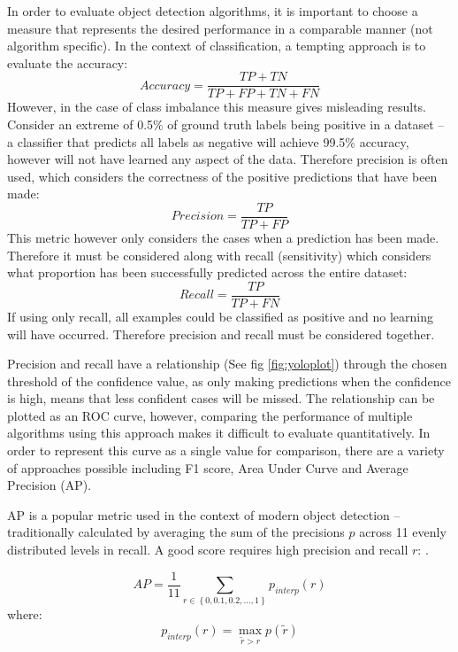 \documentclass[a4paper,twoside,12pt]{report}
\begin{document}
In order to evaluate object detection algorithms, it is important to choose a measure that represents the desired performance in a comparable manner (not algorithm specific). In the context of classification, a tempting approach is to evaluate the accuracy:
\begin{equation}
Accuracy = \frac{TP + TN}{TP + FP + TN + FN}
\end{equation}
However, in the case of class imbalance this measure gives misleading results. Consider an extreme of 0.5\% of ground truth labels being positive in a dataset -- a classifier that predicts all labels as negative will achieve 99.5\% accuracy, however will not have learned any aspect of the data. Therefore precision is often used, which considers the correctness of the positive predictions that have been made:
\begin{equation}
Precision = \frac{TP}{TP + FP}
\end{equation}
This metric however only considers the cases when a prediction has been made. Therefore it must be considered along with recall (sensitivity) which considers what proportion has been successfully predicted across the entire dataset:
\begin{equation}
Recall = \frac{TP}{TP + FN}
\end{equation}
If using only recall, all examples could be classified as positive and no learning will have occurred. Therefore precision and recall must be considered together.

Precision and recall have a relationship (See fig \ref{fig:yoloplot}) through the chosen threshold of the confidence value, as only making predictions when the confidence is high, means that less confident cases will be missed. The relationship can be plotted as an ROC curve, however, comparing the performance of multiple algorithms using this approach makes it difficult to evaluate quantitatively. In order to represent this curve as a single value for comparison, there are a variety of approaches possible including F1 score, Area Under Curve and Average Precision (AP).

AP is a popular metric used in the context of modern object detection -- traditionally calculated by averaging the sum of the precisions $p$ across 11 evenly distributed levels in recall. A good score requires high precision and recall $r$: \citep{vocdataset}.

\begin{equation}
AP = \frac{1}{11}\sum_{r\in\left\{0,0.1,0.2,...,1\right\}}^{} p_{interp}(r)
\end{equation}
where:
\begin{equation}
p_{interp}(r) =\max_{\widetilde{r} > r} p(\widetilde{r})
\end{equation}
\end{document}
